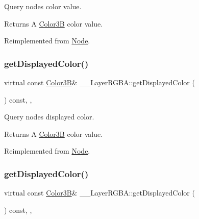 Query node\textquotesingle{}s color value. \begin{DoxyReturn}{Returns}
A \hyperlink{structColor3B}{Color3B} color value. 
\end{DoxyReturn}


Reimplemented from \hyperlink{classNode_a06721d272f5a59e02e355d95be25bb99}{Node}.

\mbox{\label{class____LayerRGBA_a621d9a8fe47abd33ec00bd3754bf6ec2}} 
\subsubsection{\texorpdfstring{get\+Displayed\+Color()}{getDisplayedColor()}\hspace{0.1cm}{\footnotesize\ttfamily [1/2]}}
{\footnotesize\ttfamily virtual const \hyperlink{structColor3B}{Color3B}\& \+\_\+\+\_\+\+Layer\+R\+G\+B\+A\+::get\+Displayed\+Color (\begin{DoxyParamCaption}{ }\end{DoxyParamCaption}) const\hspace{0.3cm}{\ttfamily [inline]}, {\ttfamily [override]}, {\ttfamily [virtual]}}

Query node\textquotesingle{}s displayed color. \begin{DoxyReturn}{Returns}
A \hyperlink{structColor3B}{Color3B} color value. 
\end{DoxyReturn}


Reimplemented from \hyperlink{classNode_a899760bbad414bfbe9fb51473e99c3eb}{Node}.

\mbox{\label{class____LayerRGBA_a621d9a8fe47abd33ec00bd3754bf6ec2}} 
\subsubsection{\texorpdfstring{get\+Displayed\+Color()}{getDisplayedColor()}\hspace{0.1cm}{\footnotesize\ttfamily [2/2]}}
{\footnotesize\ttfamily virtual const \hyperlink{structColor3B}{Color3B}\& \+\_\+\+\_\+\+Layer\+R\+G\+B\+A\+::get\+Displayed\+Color (\begin{DoxyParamCaption}{ }\end{DoxyParamCaption}) const\hspace{0.3cm}{\ttfamily [inline]}, {\ttfamily [override]}, {\ttfamily [virtual]}}

